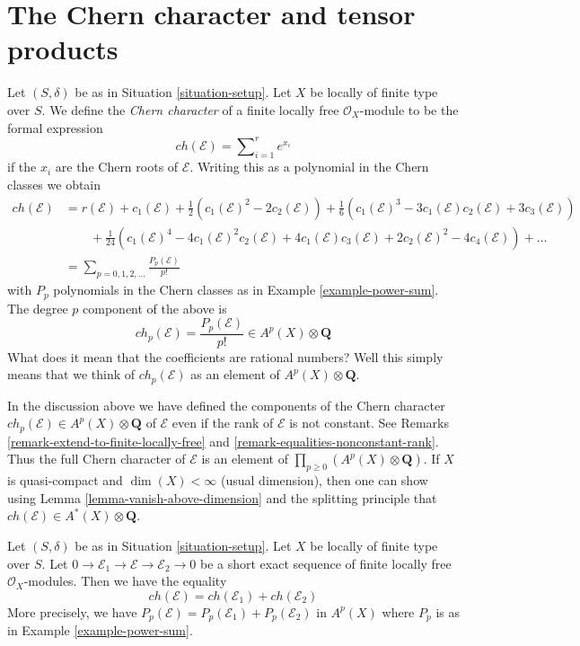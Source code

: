 \section{The Chern character and tensor products}
\label{section-chern-classes-tensor}

\noindent
Let $(S, \delta)$ be as in Situation \ref{situation-setup}.
Let $X$ be locally of finite type over $S$.
We define the {\it Chern character} of a finite locally free
$\mathcal{O}_X$-module to be the formal expression
$$
ch({\mathcal E}) = \sum\nolimits_{i=1}^r e^{x_i}
$$
if the $x_i$ are the Chern roots of ${\mathcal E}$. Writing this
as a polynomial in the Chern classes we obtain
\begin{align*}
ch(\mathcal{E})
& =
r(\mathcal{E})
+
c_1(\mathcal{E}) +
\frac{1}{2}(c_1(\mathcal{E})^2 - 2c_2(\mathcal{E}))
+
\frac{1}{6}(c_1(\mathcal{E})^3 - 3c_1(\mathcal{E})c_2(\mathcal{E}) + 3c_3(\mathcal{E})) \\
& \quad\quad +
\frac{1}{24}(c_1(\mathcal{E})^4 - 4c_1(\mathcal{E})^2c_2(\mathcal{E}) + 4c_1(\mathcal{E})c_3(\mathcal{E}) + 2c_2(\mathcal{E})^2 - 4c_4(\mathcal{E}))
+
\ldots \\
& =
\sum\nolimits_{p = 0, 1, 2, \ldots} \frac{P_p(\mathcal{E})}{p!}
\end{align*}
with $P_p$ polynomials in the Chern classes as in
Example \ref{example-power-sum}. The degree $p$ component of
the above is
$$
ch_p(\mathcal{E}) = \frac{P_p(\mathcal{E})}{p!} \in A^p(X) \otimes \mathbf{Q}
$$
What does it mean that the coefficients are rational numbers?
Well this simply means that we think of
$ch_p(\mathcal{E})$ as an element of $A^p(X) \otimes \mathbf{Q}$.

\begin{remark}
\label{remark-extend-chern-character-to-finite-locally-free}
In the discussion above we have defined the components of the Chern character
$ch_p(\mathcal{E}) \in A^p(X) \otimes \mathbf{Q}$
of $\mathcal{E}$ even if the rank of $\mathcal{E}$
is not constant. See Remarks \ref{remark-extend-to-finite-locally-free} and
\ref{remark-equalities-nonconstant-rank}. Thus the full Chern character
of $\mathcal{E}$ is
an element of $\prod_{p \geq 0} (A^p(X) \otimes \mathbf{Q})$. If $X$
is quasi-compact and $\dim(X) < \infty$ (usual dimension), then one can show
using Lemma \ref{lemma-vanish-above-dimension} and the splitting principle
that $ch(\mathcal{E}) \in A^*(X) \otimes \mathbf{Q}$.
\end{remark}

\begin{lemma}
\label{lemma-chern-character-additive}
Let $(S, \delta)$ be as in Situation \ref{situation-setup}. Let $X$ be locally
of finite type over $S$. Let
$
0 \to \mathcal{E}_1 \to \mathcal{E} \to \mathcal{E}_2 \to 0
$
be a short exact sequence of finite locally free $\mathcal{O}_X$-modules.
Then we have the equality
$$
ch(\mathcal{E}) = ch(\mathcal{E}_1) + ch(\mathcal{E}_2)
$$
More precisely, we have
$P_p(\mathcal{E}) = P_p(\mathcal{E}_1) + P_p(\mathcal{E}_2)$
in $A^p(X)$ where $P_p$ is as in Example \ref{example-power-sum}.
\end{lemma}

